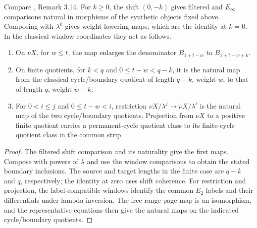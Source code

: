 \begin{proposition}
\label{sem:Literature:infinite-shift}
\label{sem:Literature:infinite-restriction}
Compare \cite{LWX126}, Remark 3.14.
For $k\ge0$, the shift $(0,-k)$ gives filtered and $E_\infty$
comparisons natural in morphisms of the synthetic objects fixed above.
Composing with $\lambda^k$ gives weight-lowering maps, which are the
identity at $k=0$. In the classical window coordinates they act
as follows.
\begin{enumerate}
\item On $\nu X$, for $w\le t$, the map enlarges the denominator
$B_{1+t-w}$ to $B_{1+t-w+k}$.
\item On finite quotients, for $k<q$ and $0\le t-w<q-k$, it is the
natural map from the classical cycle/boundary quotient of length $q-k$,
weight $w$, to that of length $q$, weight $w-k$.
\item For $0<i\le j$ and $0\le t-w<i$, restriction
$\nu X/\lambda^j\to\nu X/\lambda^i$ is the natural map of the two
cycle/boundary quotients. Projection from $\nu X$ to a positive finite
quotient carries a permanent-cycle quotient class to its finite-cycle
quotient class in the common strip.
\end{enumerate}

\end{proposition}
\begin{proof}
The filtered shift comparison and its naturality give the first maps.
Compose with powers of $\lambda$ and use the window
comparisons to obtain the stated boundary inclusions. The source and
target lengths in the finite case are $q-k$ and $q$, respectively;
the identity at zero uses shift coherence. For restriction and
projection, the label-compatible windows identify the common $E_2$
labels and their differentials under lambda inversion. The free-range
page map is an isomorphism, and the representative equations then give
the natural maps on the indicated cycle/boundary quotients.
\end{proof}


